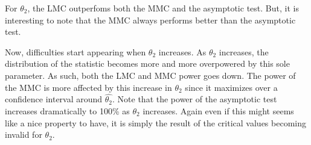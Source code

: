 \documentclass[11pt]{article}\usepackage[]{graphicx}\usepackage[]{color}
\begin{document}
\begin{table}[H]
	\centering
	\caption{Empirical levels for 250 replications of the Wald statistic where $\alpha = 5\%$, $\theta_1=1$, testing $H_0: \left[ \theta_1\theta_2^2, \theta_1^2\right] =0$ against $H_1: \left[ \theta_1\theta_2^2, \theta_1^2\right] \neq 0$}
	\label{tbl:W:12}
\end{table}


For $\theta_2$, the LMC outperfoms both the MMC and the asymptotic test. But, it is interesting to note that the MMC always performs better than the asymptotic test.

Now, difficulties start appearing when $\theta_2$ increases. As $\theta_2$ increases, the distribution of the statistic becomes more and more overpowered by this sole parameter. As such, both the LMC and MMC power goes down. The power of the MMC is more affected by this increase in $\theta_2$ since it maximizes over a confidence interval around $\hat{\theta_2}$. Note that the power of the asymptotic test increases dramatically to 100\% as $\theta_2$ increases. Again even if this might seems like a nice property to have, it is simply the result of the critical values becoming invalid for $\theta_2$.
\end{document}
